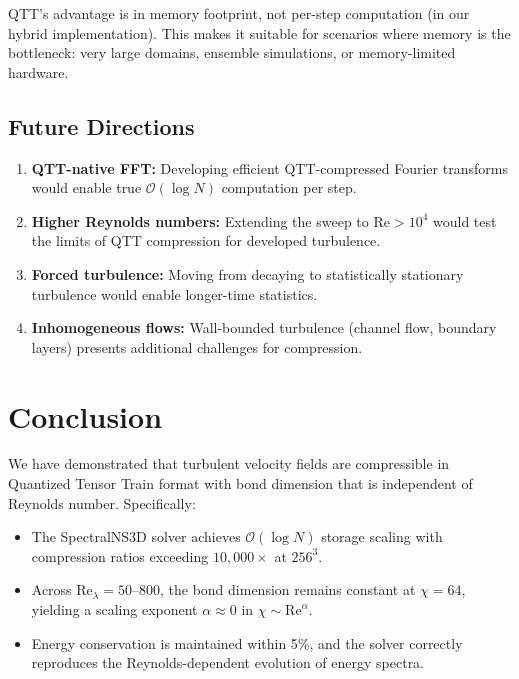 \documentclass[11pt,a4paper]{article}
\newcommand{\bigO}{\mathcal{O}}
\theoremstyle{definition}
\begin{document}
QTT's advantage is in memory footprint, not per-step computation (in our hybrid implementation).
This makes it suitable for scenarios where memory is the bottleneck: very large domains, ensemble simulations, or memory-limited hardware.

\subsection{Future Directions}

\begin{enumerate}
    \item \textbf{QTT-native FFT:} Developing efficient QTT-compressed Fourier transforms would enable true $\bigO(\log N)$ computation per step.
    
    \item \textbf{Higher Reynolds numbers:} Extending the sweep to $\text{Re} > 10^4$ would test the limits of QTT compression for developed turbulence.
    
    \item \textbf{Forced turbulence:} Moving from decaying to statistically stationary turbulence would enable longer-time statistics.
    
    \item \textbf{Inhomogeneous flows:} Wall-bounded turbulence (channel flow, boundary layers) presents additional challenges for compression.
\end{enumerate}

\section{Conclusion}
\label{sec:conclusion}

We have demonstrated that turbulent velocity fields are compressible in Quantized Tensor Train format with bond dimension that is independent of Reynolds number.
Specifically:

\begin{itemize}
    \item The SpectralNS3D solver achieves $\bigO(\log N)$ storage scaling with compression ratios exceeding $10{,}000\times$ at $256^3$.
    
    \item Across $\text{Re}_\lambda = 50$--$800$, the bond dimension remains constant at $\chi = 64$, yielding a scaling exponent $\alpha \approx 0$ in $\chi \sim \text{Re}^\alpha$.
    
    \item Energy conservation is maintained within 5\%, and the solver correctly reproduces the Reynolds-dependent evolution of energy spectra.
\end{itemize}
\end{document}
